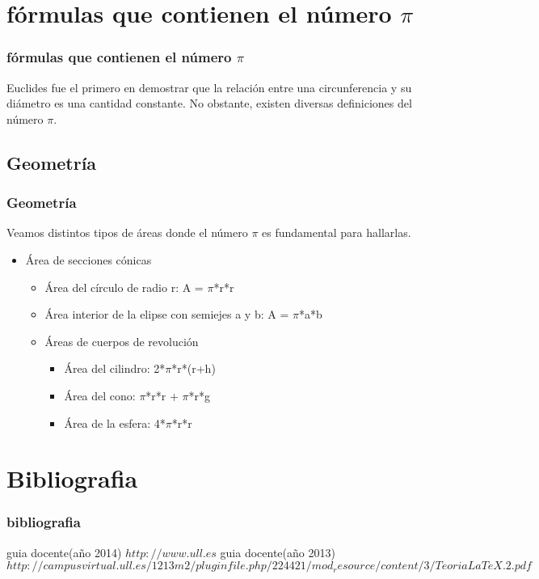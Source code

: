 \documentclass{beamer}
\begin{document}
\section{f\' ormulas que contienen el n\' umero $\pi$}
\begin{frame}
\frametitle{f\' ormulas que contienen el n\' umero $\pi$}
Euclides fue el primero en demostrar que la relaci\' on entre una circunferencia y su di\' ametro es una cantidad constante. No obstante, existen diversas definiciones del n\' umero $\pi$.
\end{frame}

\subsection{Geometr\' ia}
\begin{frame}
\frametitle{Geometr\' ia}
   Veamos distintos tipos de \' areas donde el n\' umero $\pi$ es fundamental para hallarlas.
\begin{itemize}
\item \' Area de secciones c\' onicas
\begin{itemize}
\item \' Area del c\' irculo de radio r: A = $\pi$*r*r
\item \' Area interior de la elipse con semiejes a y b: A = $\pi$*a*b
\end{itemize}
\begin{itemize}
\item \' Areas de cuerpos de revoluci\' on
\begin{itemize}
\item \' Area del cilindro: 2*$\pi$*r*(r+h)
\item \' Area del cono: $\pi$*r*r + $\pi$*r*g
\item \' Area de la esfera: 4*$\pi$*r*r 
\end{itemize}
\end{itemize}
\end{itemize}
\end{frame}


\section{Bibliografia}
\begin{frame}
\frametitle{bibliografia}
\begin{thebibliography}{10}
\beamertemplatebookbibitems
{}
guia docente(año 2014)
{\small $http://www.ull.es$}
guia docente(año 2013)
{\small $http://campusvirtual.ull.es/1213m2/pluginfile.php/224421/mod_resource/content/3/TeoriaLaTeX.2.pdf$}
\end{thebibliography}
\end{frame}
\end{document}
